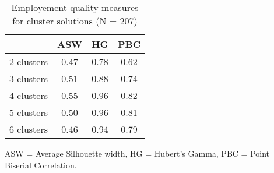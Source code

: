 \begin{table}[htp]
\footnotesize
\setlength{\tabcolsep}{35pt}
\renewcommand{\arraystretch}{1.3}
\begin{threeparttable}
\centering
\caption{Employement quality measures for cluster solutions (N = 207)} 
\label{tab:quality_clusters_job}
\begin{tabular}{lccc}
  \hline
 & ASW & HG & PBC \\ 
  \hline
2 clusters & 0.47 & 0.78 & 0.62 \\ 
  3 clusters & 0.51 & 0.88 & 0.74 \\ 
  4 clusters & 0.55 & 0.96 & 0.82 \\ 
  5 clusters & 0.50 & 0.96 & 0.81 \\ 
  6 clusters & 0.46 & 0.94 & 0.79 \\ 
   \hline
\end{tabular}
\begin{tablenotes}
\scriptsize
\item ASW = Average Silhouette width, HG = Hubert's Gamma, PBC = Point Biserial Correlation.
\end{tablenotes}
\end{threeparttable}
\end{table}
